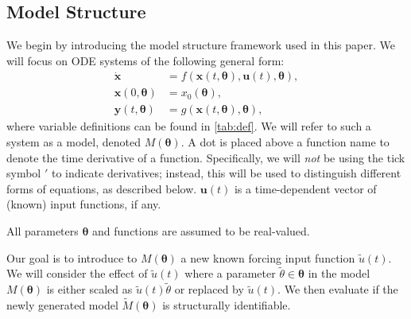 \documentclass[a4paper,fleqn]{cas-dc}
\theoremstyle{definition}
\begin{document}
\subsection{Model Structure} \label{s:model_structure}
\noindent We begin by introducing the model structure framework used in this paper. We will focus on ODE systems of the following general form:
\begin{equation} \label{eq:model}
    \begin{aligned}
    \dot{\pmb{x}} &=f(\pmb{x}(t, \pmb{\theta}),\pmb{u}(t),\pmb{\theta}),\\
    \pmb{x}(0, \pmb{\theta}) &= x_0(\pmb{\theta}), \\
    \pmb{y}(t, \pmb{\theta}) &= g(\pmb{x}(t, \pmb{\theta}), \pmb{\theta}),
    \end{aligned}
\end{equation}
where variable definitions can be found in \cref{tab:def}. 
We will refer to such a system as a model, denoted $M(\pmb{\theta})$.
A dot is placed above a function name to denote the time derivative of a function. Specifically, we will \emph{not} be using the tick symbol $'$ to indicate derivatives; instead, this will be used to distinguish different forms of equations, as described below.
$\pmb{u}(t)$ is a time-dependent vector of (known) input functions, if any.

All parameters $\pmb{\theta}$ and functions are assumed to be real-valued. 

Our goal is to introduce to $M(\pmb{\theta})$ a new known forcing input function $\tilde{u}(t)$. 
We will consider the effect of $\tilde{u}(t)$ where a parameter $\tilde{\theta} \in \pmb{\theta}$ in the model $M(\pmb{\theta})$ is either scaled as $\tilde{u}(t) \tilde{\theta}$ or replaced by $\tilde{u}(t)$.
We then evaluate if the newly generated model $\tilde{M}(\pmb{\theta})$ is structurally identifiable.
\end{document}
